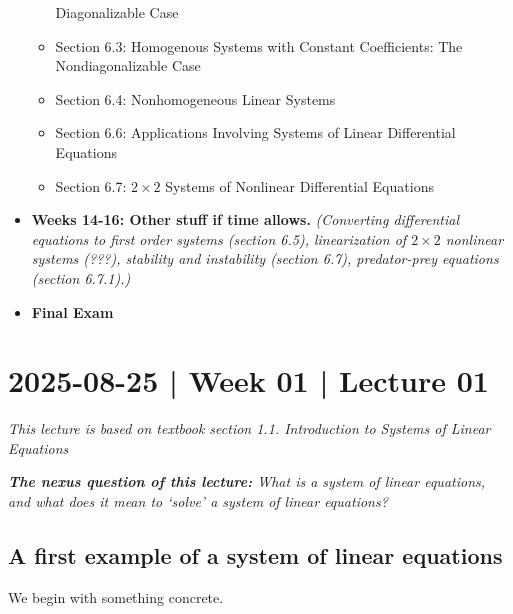 \documentclass[10pt]{article}
\theoremstyle{definition}
\begin{document}
\begin{itemize}
\begin{itemize}
    Diagonalizable Case
    \item Section 6.3: Homogenous Systems with Constant Coefficients: The
    Nondiagonalizable Case
    \item Section 6.4: Nonhomogeneous Linear Systems
    \item Section 6.6: Applications Involving Systems of Linear Differential Equations
    \item Section 6.7: $2\times 2$ Systems of Nonlinear Differential Equations
  \end{itemize}
  \item \textbf{Weeks 14-16: Other stuff if time allows.} \textit{(Converting differential
  equations to first order systems (section 6.5), linearization of $2 \times 2$ nonlinear
  systems (???), stability and instability (section 6.7), predator-prey
  equations (section 6.7.1).)}
  \item \textbf{Final Exam}
\end{itemize}

\newpage
\section{2025-08-25 | Week 01 | Lecture 01}
\textit{This lecture is based on textbook section 1.1. Introduction to Systems
  of Linear Equations}

\begin{center}
  \begin{tcolorbox}[width=0.9\textwidth, colback=white, colframe=black]
    \textit{\textbf{The nexus question of this lecture:} What is a system of
      linear equations, and what does it mean to `solve' a system of linear
      equations?}
  \end{tcolorbox}
\end{center}

\subsection{A first example of a system of linear equations}
We begin with something concrete.
\end{document}
